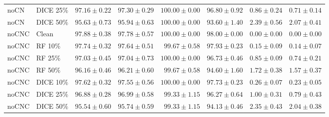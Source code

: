 {\begin{longtable}{llrrrrrr}
noCN & DICE 25\% & $97.16\pm0.22$ & $97.30\pm0.29$ & $100.00\pm0.00$ & $96.80\pm0.92$ & $0.86\pm0.24$ & $0.71\pm0.14$ \\
noCN & DICE 50\% & $95.63\pm0.73$ & $95.94\pm0.63$ & $100.00\pm0.00$ & $93.60\pm1.40$ & $2.39\pm0.56$ & $2.07\pm0.41$ \\
noCNC & Clean & $97.88\pm0.38$ & $97.78\pm0.57$ & $100.00\pm0.00$ & $98.00\pm0.00$ & $0.00\pm0.00$ & $0.00\pm0.00$ \\
noCNC & RF 10\% & $97.74\pm0.32$ & $97.64\pm0.51$ & $99.67\pm0.58$ & $97.93\pm0.23$ & $0.15\pm0.09$ & $0.14\pm0.07$ \\
noCNC & RF 25\% & $97.03\pm0.45$ & $97.04\pm0.73$ & $100.00\pm0.00$ & $96.73\pm0.46$ & $0.85\pm0.09$ & $0.74\pm0.21$ \\
noCNC & RF 50\% & $96.16\pm0.46$ & $96.21\pm0.60$ & $99.67\pm0.58$ & $94.60\pm1.60$ & $1.72\pm0.38$ & $1.57\pm0.37$ \\
noCNC & DICE 10\% & $97.62\pm0.32$ & $97.55\pm0.56$ & $100.00\pm0.00$ & $97.73\pm0.23$ & $0.26\pm0.07$ & $0.23\pm0.05$ \\
noCNC & DICE 25\% & $96.88\pm0.28$ & $96.99\pm0.58$ & $99.33\pm1.15$ & $96.27\pm0.64$ & $1.00\pm0.31$ & $0.79\pm0.43$ \\
noCNC & DICE 50\% & $95.54\pm0.60$ & $95.74\pm0.59$ & $99.33\pm1.15$ & $94.13\pm0.46$ & $2.35\pm0.43$ & $2.04\pm0.38$ \\
\end{longtable}
}

